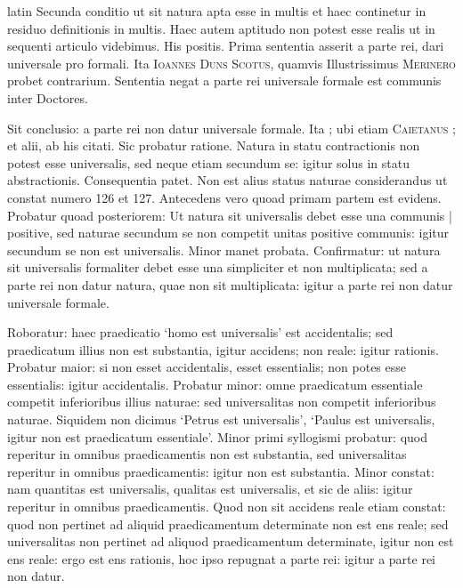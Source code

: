 \begin{otherlanguage*}{latin}
\pstart
  Secunda conditio ut sit natura apta esse in multis et haec continetur in residuo definitionis in multis. Haec autem aptitudo non potest esse realis ut in sequenti articulo videbimus. His positis. Prima sententia asserit a parte rei, dari universale pro formali. Ita \textsc{Ioannes Duns Scotus}, quamvis Illustrissimus \textsc{Merinero}\index[persons]{} probet contrarium. Sententia negat a parte rei universale formale est communis inter Doctores. 
\pend

\pstart
  Sit conclusio: a parte rei non datur universale formale. Ita ; ubi etiam \textsc{Caietanus} ;  et alii, ab his  citati. Sic probatur ratione. Natura in statu contractionis non potest esse universalis, sed neque etiam secundum se: igitur solus in statu abstractionis. Consequentia patet. Non est alius status naturae considerandus ut constat numero 126 et 127. Antecedens vero quoad primam partem est evidens. Probatur quoad posteriorem: Ut natura sit universalis debet esse una communis \textnormal{|} positive, sed naturae secundum se non competit unitas positive communis: igitur secundum se non est universalis. Minor manet probata. Confirmatur: ut natura sit universalis formaliter debet esse una simpliciter et non multiplicata; sed a parte rei non datur natura, quae non sit multiplicata: igitur a parte rei non datur universale formale. 
\pend

\pstart
  Roboratur: haec praedicatio `homo est universalis' est accidentalis; sed praedicatum illius non est substantia, igitur accidens; non reale: igitur rationis. Probatur maior: si non esset accidentalis, esset essentialis; non potes esse essentialis: igitur accidentalis. Probatur minor: omne praedicatum essentiale competit inferioribus illius naturae: sed universalitas non competit inferioribus naturae. Siquidem non dicimus `Petrus est universalis', `Paulus est universalis, igitur non est praedicatum essentiale'. Minor primi syllogismi probatur: quod reperitur in omnibus praedicamentis non est substantia, sed universalitas reperitur in omnibus praedicamentis: igitur non est substantia. Minor constat: nam quantitas est universalis, qualitas est universalis, et sic de aliis: igitur reperitur in omnibus praedicamentis. Quod non sit accidens  reale etiam constat: quod non pertinet ad aliquid praedicamentum determinate non est ens reale; sed universalitas non pertinet ad aliquod praedicamentum determinate, igitur non est ens reale: ergo est ens rationis, hoc ipso repugnat a parte rei: igitur a parte rei non datur. 
\pend


\end{otherlanguage*}
